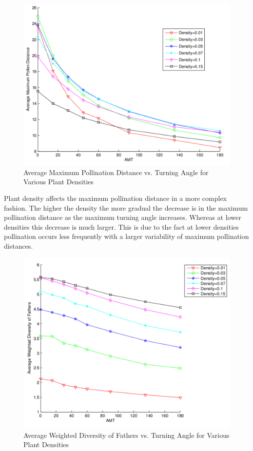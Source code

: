 \begin{figure}
  \begin{center}
  \includegraphics[scale=0.5]{Figures/MaxPollenVsAMT.pdf}
  \end{center}
  \caption{\small Average Maximum Pollination Distance vs. Turning Angle for Various Plant Densities}
  \label{AvgMaxDTreesN}
\end{figure}

Plant density affects the maximum pollination distance in a more complex
fashion.  The higher the density the more gradual the decrease is in the maximum
pollination distance as the maximum turning angle increases.  Whereas at lower
densities this decrease is much larger.  This is due to the fact at lower
densities pollination occurs less frequently with a larger variability of
maximum pollination distances.

\begin{figure}
  \begin{center}
  \includegraphics[scale=0.5]{Figures/WDFvsAMT.pdf}
  \end{center}
  \caption{\small Average Weighted Diversity of Fathers vs. Turning Angle for Various Plant Densities}
  \label{EFathers}
\end{figure}

